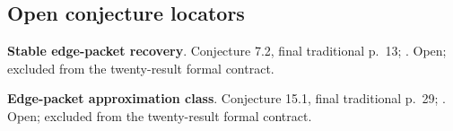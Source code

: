 \subsection{Open conjecture locators}
\textbf{Stable edge-packet recovery}. Conjecture 7.2, final traditional p.~13; . Open; excluded from the twenty-result formal contract.\par
\textbf{Edge-packet approximation class}. Conjecture 15.1, final traditional p.~29; . Open; excluded from the twenty-result formal contract.\par
